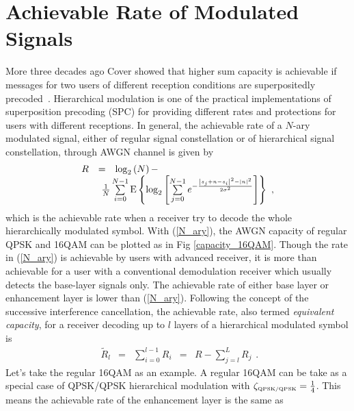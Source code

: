 \documentclass[10pt,fleqn, twocolumn]{IEEEtran}
\begin{document}
\section{Achievable Rate of Modulated Signals~\label{Info_Theory}}
More three decades ago Cover showed that higher sum capacity is
achievable if messages for two users of different reception
conditions are superpositedly precoded~\cite{Cover72}.
Hierarchical modulation is one of the practical implementations of
superposition precoding (SPC) for providing different rates and
protections for users with different receptions. In general, the
achievable rate of a $N$-ary modulated signal, either of regular
signal constellation or of hierarchical signal constellation,
through AWGN channel is given by~\cite{Unge82}
\begin{equation}
\begin{array}{lcl}
R&=&\log_{2}\left(N\right)-\\
&&\hspace{-0.20in}\frac{1}{N}\sum\limits_{i=0}^{N-1}\mbox{E}\left\{\log_{2}\left[\sum\limits_{j=0}^{N-1}e^{-\frac{\left|s_{j}+n-s_{i}\right|^2-\left|n\right|^2}{2\sigma^2}}\right]\right\}\
,
\end{array}\label{N_ary}
\end{equation}
\noindent which is the achievable rate when a receiver try to
decode the whole hierarchically modulated symbol. With
(\ref{N_ary}), the AWGN capacity of regular QPSK and 16QAM can be
plotted as in Fig \ref{capacity_16QAM}. Though the rate in
(\ref{N_ary}) is achievable by users with advanced receiver, it is
more than achievable for a user with a conventional demodulation
receiver which usually detects the base-layer signals only. The
achievable rate of either base layer or enhancement layer is lower
than (\ref{N_ary}). Following the concept of the successive
interference cancellation, the achievable rate, also termed {\em
equivalent capacity}, for a receiver decoding up to $l$ layers of
a hierarchical modulated symbol is~\cite{Huber94}
\begin{equation}
\begin{array}{rcccl}
\tilde{R}_{l}&=&\sum\limits_{i=0}^{l-1}R_{i}& = &
R-\sum\limits_{j=l}^{L}{R}_{j}
\end{array}.\label{R_equiv}
\end{equation}
\noindent Let's take the regular 16QAM as an example. A regular
16QAM can be take as a special case of QPSK/QPSK hierarchical
modulation with $\zeta_{\mbox{\tiny QPSK/QPSK}}=\frac{1}{4}$. This
means the achievable rate of the enhancement layer is the same as
\end{document}
